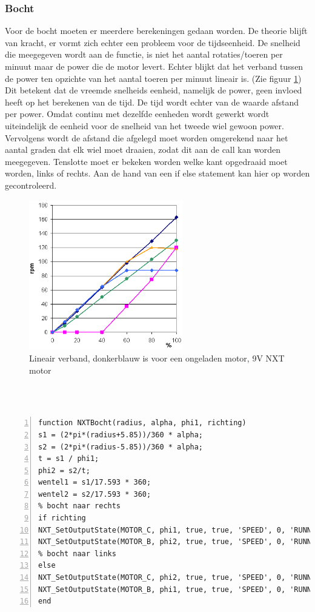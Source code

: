 \documentclass[a4paper]{article}
\begin{document}
\subsubsection{Bocht}
Voor de bocht moeten er meerdere berekeningen gedaan worden. De theorie blijft van kracht, er vormt zich echter een probleem voor de tijdseenheid. De snelheid die meegegeven wordt aan de functie, is niet het aantal rotaties/toeren per minuut maar de power die de motor levert. Echter blijkt dat het verband tussen de power ten opzichte van het aantal toeren per minuut lineair is. (Zie figuur \ref{fig:lineairverband}) Dit betekent dat de vreemde snelheids eenheid, namelijk de power, geen invloed heeft op het berekenen van de tijd. De tijd wordt echter van de waarde afstand per power. Omdat continu met dezelfde eenheden wordt gewerkt wordt uiteindelijk de eenheid voor de snelheid van het tweede wiel gewoon power. Vervolgens wordt de afstand die afgelegd moet worden omgerekend naar het aantal graden dat elk wiel moet draaien, zodat dit aan de call kan worden meegegeven. Tenslotte moet er bekeken worden welke kant opgedraaid moet worden, links of rechts. Aan de hand van een if else statement kan hier op worden gecontroleerd.
\begin{figure}[h]
	\centering
	\includegraphics[width=0.6\textwidth]{imgs/lineair.png}
	\caption{Lineair verband, donkerblauw is voor een ongeladen motor, 9V NXT motor\protect\footnotemark}
	\label{fig:lineairverband}
\end{figure}
\\\\
\vspace{5cm}
\begin{lstlisting}[caption=Bocht, label=lst:bocht, numbers=left]
function NXTBocht(radius, alpha, phi1, richting)
s1 = (2*pi*(radius+5.85))/360 * alpha;
s2 = (2*pi*(radius-5.85))/360 * alpha;
t = s1 / phi1;
phi2 = s2/t;
wentel1 = s1/17.593 * 360;
wentel2 = s2/17.593 * 360;
% bocht naar rechts
if richting
NXT_SetOutputState(MOTOR_C, phi1, true, true, 'SPEED', 0, 'RUNNING', wentel1, 'dontreply');
NXT_SetOutputState(MOTOR_B, phi2, true, true, 'SPEED', 0, 'RUNNING', wentel2, 'dontreply');
% bocht naar links
else
NXT_SetOutputState(MOTOR_C, phi2, true, true, 'SPEED', 0, 'RUNNING', wentel2, 'dontreply');
NXT_SetOutputState(MOTOR_B, phi1, true, true, 'SPEED', 0, 'RUNNING', wentel1, 'dontreply');
end
\end{lstlisting}
\end{document}
